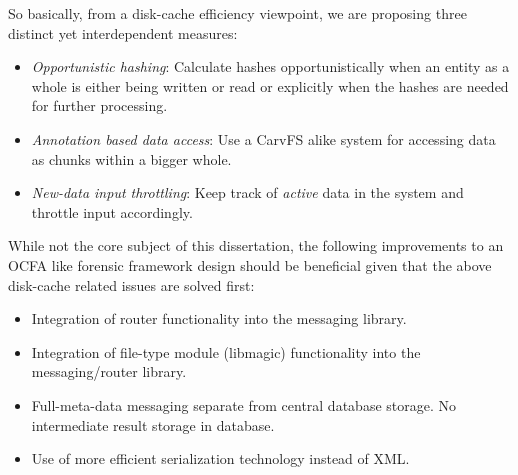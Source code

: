 So basically, from a disk-cache efficiency viewpoint, we are proposing three distinct yet interdependent measures:
\begin{itemize}
\item \emph{Opportunistic hashing}: Calculate hashes opportunistically when an entity as a whole is either being written or read or explicitly when the hashes are needed for further processing.
\item \emph{Annotation based data access}: Use a CarvFS alike system for accessing data as chunks within a bigger whole.
\item \emph{New-data input throttling}: Keep track of \emph{active} data in the system and throttle input accordingly.
\end{itemize}
While not the core subject of this dissertation, the following improvements to an OCFA like  forensic framework design should be beneficial given that the above disk-cache related issues are solved first:
\begin{itemize}
\item Integration of router functionality into the messaging library.
\item Integration of file-type module (libmagic) functionality into the messaging/router library.
\item Full-meta-data messaging separate from central database storage. No intermediate result storage in database.
\item Use of more efficient serialization technology instead of XML.
\end{itemize}


